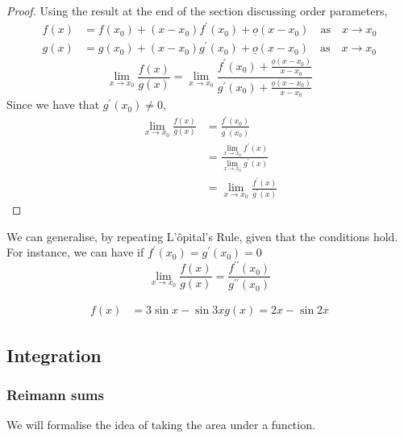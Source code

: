 \documentclass{article}
\begin{document}
\begin{proof}
    Using the result at the end of the section discussing order parameters,
    \begin{align*}
        f(x) &= f(x_0) + (x - x_0)f^{\prime}(x_0) + \underline{o}(x - x_0) \quad \text{as} \quad x \rightarrow x_0 \\
        g(x) &= g(x_0) + (x - x_0)g^{\prime}(x_0) + \underline{o}(x - x_0) \quad \text{as} \quad x \rightarrow x_0
    \end{align*}
    \[
        \lim_{x \rightarrow x_0}{\frac{f(x)}{g(x)}} = \lim_{x \rightarrow x_0}{\frac{f^{\prime}(x_0) + \frac{\underline{o}(x - x_0)}{x - x_0}}{g^{\prime}(x_0) + \frac{\underline{o}(x - x_0)}{x - x_0}}}
    \]
    Since we have that $g^{\prime}(x_0) \neq 0$, 
    \begin{align*}
        \lim_{x \rightarrow x_0}{\frac{f(x)}{g(x)}} &= \frac{f^{\prime}(x_0)}{g^{\prime}(x_0)} \\
        &= \frac{\lim_{x \rightarrow x_0}{f^{\prime}(x)}}{\lim_{x \rightarrow x_0}{g^{\prime}(x)}} \tag{assuming continuous first derivatives}\\
        &= \lim_{x \rightarrow x_0}{\frac{f^{\prime}(x)}{g^{\prime}(x)}} \tag{already checked $g(x_0) \neq 0$}
    \end{align*}
\end{proof}

We can generalise, by repeating L'\^opital's Rule, given that the conditions hold. For instance, we can have if $f^{\prime}(x_0) = g^{\prime}(x_0) = 0$
\[
    \lim_{x \rightarrow x_0}{\frac{f(x)}{g(x)}} = \frac{f^{\prime\prime}(x_0)}{g^{\prime\prime}(x_0)}
\]

\begin{eg}
    \begin{align*}
        f(x) &= 3\sin{x} - \sin{3x}
        g(x) = 2x - \sin{2x}
    \end{align*}
\end{eg}


\subsection{Integration}
\subsubsection{Reimann sums}
We will formalise the idea of taking the area under a function. 
\end{document}
